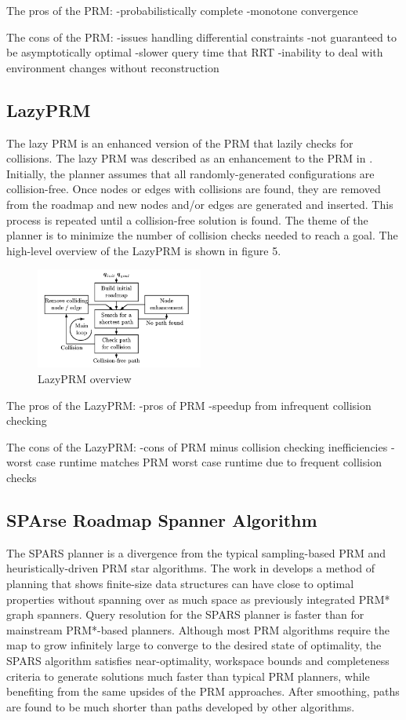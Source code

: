 \documentclass[conference]{IEEEtran} \usepackage[T1]{fontenc} \usepackage[backend=biber, style=ieee]{biblatex}
\begin{document}
The pros of the PRM:
-probabilistically complete
-monotone convergence

The cons of the PRM:
-issues handling differential constraints
-not guaranteed to be asymptotically optimal
-slower query time that RRT
-inability to deal with environment changes without reconstruction

\subsection{LazyPRM} \label{LazyPRM}
The lazy PRM is an enhanced version of the PRM that lazily checks for collisions. The lazy PRM was described as an enhancement to the PRM in \cite{lazy_prm}. Initially, 
the planner assumes that all randomly-generated configurations are collision-free. Once nodes or edges with collisions are found, they are removed from the roadmap and
new nodes and/or edges are generated and inserted. This process is repeated until a collision-free solution is found. The theme of the planner is to minimize the number
of collision checks needed to reach a goal. The high-level overview of the LazyPRM is shown in figure 5.

\begin{figure}
\label{figure5} 
\centering 
\includegraphics[width=0.49\textwidth]{lazy_prm}
\caption{LazyPRM overview}
\end{figure}

The pros of the LazyPRM:
-pros of PRM
-speedup from infrequent collision checking

The cons of the LazyPRM:
-cons of PRM minus collision checking inefficiencies
-worst case runtime matches PRM worst case runtime due to frequent collision checks

\subsection{SPArse Roadmap Spanner Algorithm} \label{SPARS}
The SPARS planner is a divergence from the typical sampling-based PRM and heuristically-driven PRM star algorithms. The work in \cite{spars} develops a method of planning 
that shows finite-size data structures can have close to optimal properties without spanning over as much space as previously integrated PRM* graph spanners. Query
resolution for the SPARS planner is faster than for mainstream PRM*-based planners. Although most PRM algorithms require the map to grow infinitely large to converge to 
the desired state of optimality, the SPARS algorithm satisfies near-optimality, workspace bounds and completeness criteria to generate solutions much faster than typical
PRM planners, while benefiting from the same upsides of the PRM approaches. After smoothing, paths are found to be much shorter than paths developed by other algorithms.
\end{document}

